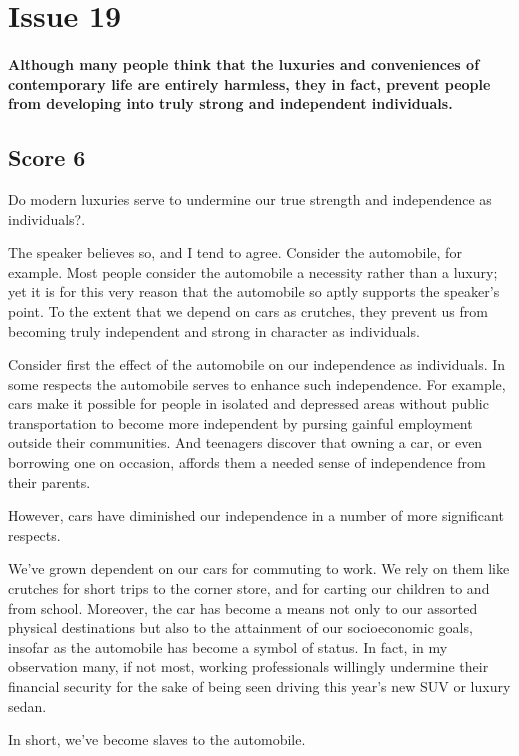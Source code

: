 \section{Issue 19}
\paragraph{
Although many people think that the luxuries and conveniences of contemporary life are entirely harmless, they in fact, prevent people from developing into truly strong and independent individuals.
}
\subsection{Score 6}


Do modern luxuries serve to undermine our true strength and independence as individuals?.


The speaker believes so, and I tend to agree.
Consider the automobile, for example.
Most people consider the automobile a necessity rather than a luxury; yet it is for this very reason that the automobile so aptly supports the speaker's point.
To the extent that we depend on cars as crutches, they prevent us from becoming truly independent and strong in character as individuals.


Consider first the effect of the automobile on our independence as individuals.
In some respects the automobile serves to enhance such independence.
For example, cars make it possible for people in isolated and depressed areas without public transportation to become more independent by pursing gainful employment outside their communities.
And teenagers discover that owning a car, or even borrowing one on occasion, affords them a needed sense of independence from their parents.


However, cars have diminished our independence in a number of more significant respects.


We've grown dependent on our cars for commuting to work.
We rely on them like crutches for short trips to the corner store, and for carting our children to and from school.
Moreover, the car has become a means not only to our assorted physical destinations but also to the attainment of our socioeconomic goals, insofar as the automobile has become a symbol of status.
In fact, in my observation many, if not most, working professionals willingly undermine their financial security for the sake of being seen driving this year's new SUV or luxury sedan.


In short, we've become slaves to the automobile.


